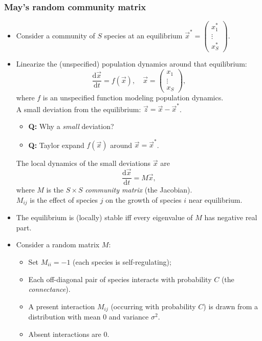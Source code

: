 \documentclass[20pt]{extarticle}
\begin{document}
\subsubsection*{May's random community matrix}

\begin{itemize}
\item Consider a community of $S$ species at an equilibrium $\vec{x}^* = \begin{pmatrix} x_1^* \\ \vdots \\ x_S^* \end{pmatrix}$. 
\item Linearize the (unspecified) population dynamics around that equilibrium:
\[ \frac{\text{d}\vec{x}}{\text{d}t} = f(\vec{x}),\quad \vec{x} = \begin{pmatrix} x_1 \\ \vdots \\ x_S \end{pmatrix}, \]
where $f$ is an unspecified function modeling population dynamics.\\
A small deviation from the equilibrium: $\vec{z} = \vec{x} - \vec{x}^*$.
	\begin{itemize}
	\item \textbf{Q:} Why a \emph{small} deviation?
	\item \textbf{Q:} Taylor expand $f(\vec{x})$ around $\vec{x} = \vec{x}^*$.
	\end{itemize}
The local dynamics of the small deviations $\vec{x}$ are
\[ \frac{\text{d}\vec{x}}{\text{d}t} = M \vec{x}, \]
where $M$ is the $S\times S$ \emph{community matrix} (the Jacobian).\\
$M_{ij}$ is the effect of species $j$ on the growth of species $i$ near equilibrium.
\item The equilibrium is (locally) stable iff every eigenvalue of $M$ has negative real part.
\item Consider a random matrix $M$:
	\begin{itemize}
	\item Set $M_{ii} = -1$ (each species is self-regulating);
	\item Each off-diagonal pair of species interacts with probability $C$ (the \emph{connectance}).
	\item A present interaction $M_{ij}$ (occurring with probability $C$) is drawn from a distribution with mean $0$ and variance $\sigma^2$.
	\item Absent interactions are $0$.

\end{itemize}
\end{itemize}
\end{document}
